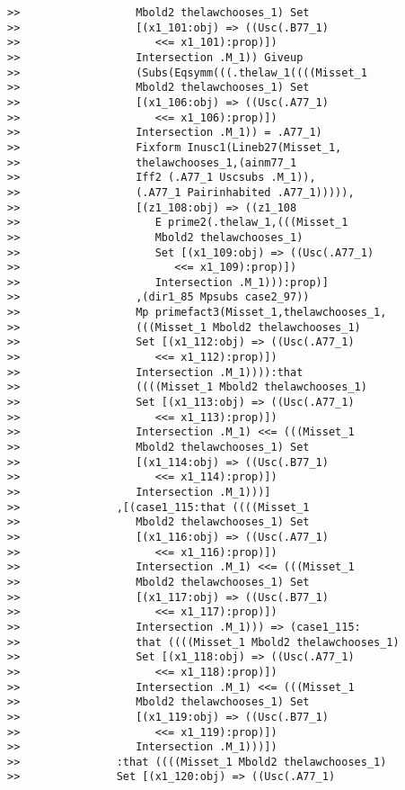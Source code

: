 \documentclass[12pt]{article}
\begin{document}
\begin{verbatim}
>>                  Mbold2 thelawchooses_1) Set
>>                  [(x1_101:obj) => ((Usc(.B77_1)
>>                     <<= x1_101):prop)])
>>                  Intersection .M_1)) Giveup
>>                  (Subs(Eqsymm(((.thelaw_1((((Misset_1
>>                  Mbold2 thelawchooses_1) Set
>>                  [(x1_106:obj) => ((Usc(.A77_1)
>>                     <<= x1_106):prop)])
>>                  Intersection .M_1)) = .A77_1)
>>                  Fixform Inusc1(Lineb27(Misset_1,
>>                  thelawchooses_1,(ainm77_1
>>                  Iff2 (.A77_1 Uscsubs .M_1)),
>>                  (.A77_1 Pairinhabited .A77_1))))),
>>                  [(z1_108:obj) => ((z1_108
>>                     E prime2(.thelaw_1,(((Misset_1
>>                     Mbold2 thelawchooses_1)
>>                     Set [(x1_109:obj) => ((Usc(.A77_1)
>>                        <<= x1_109):prop)])
>>                     Intersection .M_1))):prop)]
>>                  ,(dir1_85 Mpsubs case2_97))
>>                  Mp primefact3(Misset_1,thelawchooses_1,
>>                  (((Misset_1 Mbold2 thelawchooses_1)
>>                  Set [(x1_112:obj) => ((Usc(.A77_1)
>>                     <<= x1_112):prop)])
>>                  Intersection .M_1)))):that
>>                  ((((Misset_1 Mbold2 thelawchooses_1)
>>                  Set [(x1_113:obj) => ((Usc(.A77_1)
>>                     <<= x1_113):prop)])
>>                  Intersection .M_1) <<= (((Misset_1
>>                  Mbold2 thelawchooses_1) Set
>>                  [(x1_114:obj) => ((Usc(.B77_1)
>>                     <<= x1_114):prop)])
>>                  Intersection .M_1)))]
>>               ,[(case1_115:that ((((Misset_1
>>                  Mbold2 thelawchooses_1) Set
>>                  [(x1_116:obj) => ((Usc(.A77_1)
>>                     <<= x1_116):prop)])
>>                  Intersection .M_1) <<= (((Misset_1
>>                  Mbold2 thelawchooses_1) Set
>>                  [(x1_117:obj) => ((Usc(.B77_1)
>>                     <<= x1_117):prop)])
>>                  Intersection .M_1))) => (case1_115:
>>                  that ((((Misset_1 Mbold2 thelawchooses_1)
>>                  Set [(x1_118:obj) => ((Usc(.A77_1)
>>                     <<= x1_118):prop)])
>>                  Intersection .M_1) <<= (((Misset_1
>>                  Mbold2 thelawchooses_1) Set
>>                  [(x1_119:obj) => ((Usc(.B77_1)
>>                     <<= x1_119):prop)])
>>                  Intersection .M_1)))])
>>               :that ((((Misset_1 Mbold2 thelawchooses_1)
>>               Set [(x1_120:obj) => ((Usc(.A77_1)

\end{verbatim}
\end{document}
